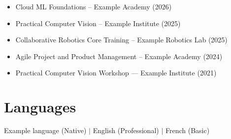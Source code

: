 \documentclass[11pt,a4paper]{article}
\begin{document}
\begin{itemize}


\item Cloud ML Foundations -- Example Academy (2026)

\item Practical Computer Vision -- Example Institute (2025)

\item Collaborative Robotics Core Training -- Example Robotics Lab (2025)

\item Agile Project and Product Management -- Example Academy (2024)

\item Practical Computer Vision Workshop — Example Institute (2021)

\end{itemize}


\section*{ \Large Languages}

Example language (Native) \quad $|$ \quad English (Professional) \quad $|$ \quad French (Basic)
\end{document}

